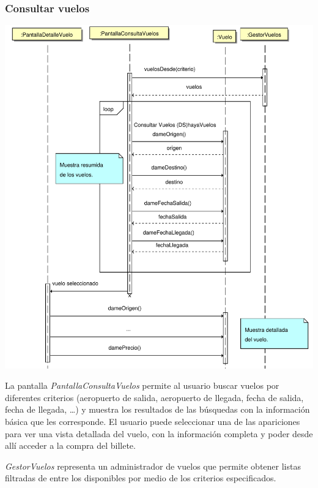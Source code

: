 \documentclass[11pt, a4paper, twoside, titlepage]{article}
\begin{document}
			\subsubsection{Consultar vuelos}
				\begin{center}
					\includegraphics[scale=.5]{diseno/diagramas/consultarvuelos.pdf}
				\end{center}

				La pantalla {\itshape PantallaConsultaVuelos} permite al usuario buscar vuelos por diferentes criterios (aeropuerto de salida, aeropuerto de llegada, fecha de salida, fecha de llegada, \ldots) y muestra los resultados de las búsquedas con la información básica que les corresponde. El usuario puede seleccionar una de las apariciones para ver una vista detallada del vuelo, con la información completa y poder desde allí acceder a la compra del billete.

				{\itshape GestorVuelos} representa un administrador de vuelos que permite obtener listas filtradas de entre los disponibles por medio de los criterios especificados.
			
\end{document}
